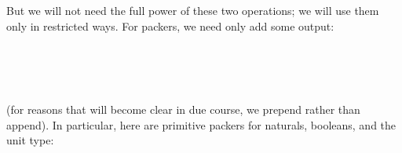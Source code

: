 \documentclass[fleqn,runningheads]{llncs}
\begin{document}
But we will not need the full power of these two operations; we will use them only in restricted ways. For packers, we need only add some output:
\begin{code}%
\>[0]\AgdaSpace{}%
\AgdaSymbol{:}\AgdaSpace{}%
\AgdaSpace{}%
\AgdaSymbol{(}\AgdaSpace{}%
\AgdaSymbol{)}\<%
\\
\>[0]\AgdaSpace{}%
\AgdaSpace{}%
\AgdaSymbol{=}\AgdaSpace{}%
\<%
\\
\>[0][@{}l@{\AgdaIndent{0}}]%
\>[2]\AgdaSpace{}%
\AgdaSpace{}%
\<%
\\
%
\>[2]\AgdaSpace{}%
\AgdaSymbol{(}\AgdaSpace{}%
\AgdaOperator{\AgdaFunction{++}}\AgdaSpace{}%
\AgdaSymbol{)}\<%
\end{code}
(for reasons that will become clear in due course, we prepend rather than append). In particular, here are primitive packers for naturals, booleans, and the unit type:
\begin{code}%
\>[0]\AgdaSpace{}%
\AgdaSymbol{:}\AgdaSpace{}%
\AgdaSpace{}%
\<%
\\
\>[0]\AgdaSpace{}%
\AgdaSpace{}%
\AgdaSymbol{=}\AgdaSpace{}%
\AgdaSpace{}%
\AgdaSymbol{(}\AgdaSpace{}%
\AgdaSymbol{)}\<%
\\
%
\\[\AgdaEmptyExtraSkip]%
\>[0]\AgdaSpace{}%
\AgdaSymbol{:}\AgdaSpace{}%
\AgdaSpace{}%
\<%
\\
\>[0]\AgdaSpace{}%
\AgdaSpace{}%
\AgdaSymbol{=}\AgdaSpace{}%
\AgdaSpace{}%
\AgdaOperator{\AgdaFunction{[}}\AgdaSpace{}%
\AgdaSpace{}%
\AgdaOperator{\AgdaFunction{]}}\<%
\\
%
\\[\AgdaEmptyExtraSkip]%
\>[0]\AgdaSpace{}%
\AgdaSymbol{:}\AgdaSpace{}%
\AgdaSpace{}%
\<%
\\
\>[0]\AgdaSpace{}%
\AgdaSpace{}%
\AgdaSymbol{=}\AgdaSpace{}%
\AgdaSpace{}%
\<%
\end{code}
\end{document}
